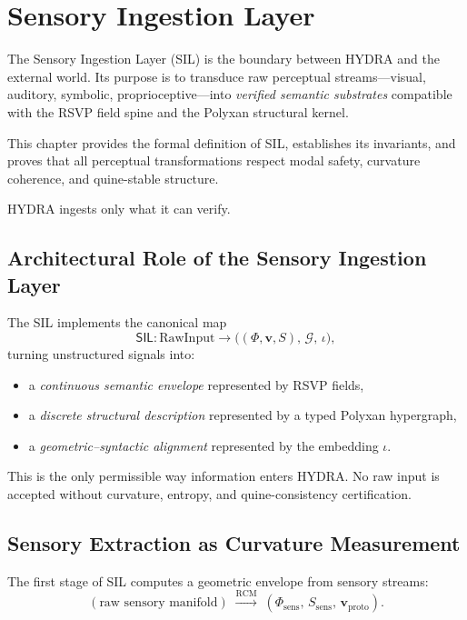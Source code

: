 \chapter{Sensory Ingestion Layer}
\label{ch:46}

The Sensory Ingestion Layer (SIL) is the boundary between HYDRA and the external world.  
Its purpose is to transduce raw perceptual streams---visual, auditory, symbolic, proprioceptive---into \emph{verified semantic substrates} compatible with the RSVP field spine and the Polyxan structural kernel.

This chapter provides the formal definition of SIL, establishes its invariants, and proves that all perceptual transformations respect modal safety, curvature coherence, and quine-stable structure.

HYDRA ingests only what it can verify.

\section{Architectural Role of the Sensory Ingestion Layer}

The SIL implements the canonical map
\[
\mathsf{SIL} :
\mathrm{RawInput}
\longrightarrow
\bigl((\Phi,\mathbf{v},S),\,\mathcal{G},\,\iota\bigr),
\]
turning unstructured signals into:
\begin{itemize}
\item a \emph{continuous semantic envelope} represented by RSVP fields,
\item a \emph{discrete structural description} represented by a typed Polyxan hypergraph,
\item a \emph{geometric--syntactic alignment} represented by the embedding $\iota$.
\end{itemize}

This is the only permissible way information enters HYDRA.  
No raw input is accepted without curvature, entropy, and quine-consistency certification.

\section{Sensory Extraction as Curvature Measurement}

The first stage of SIL computes a geometric envelope from sensory streams:
\[
(\text{raw sensory manifold})
\;\xrightarrow{\mathrm{RCM}}\;
(\Phi_{\mathrm{sens}},\, S_{\mathrm{sens}},\, \mathbf{v}_{\mathrm{proto}}).
\]

